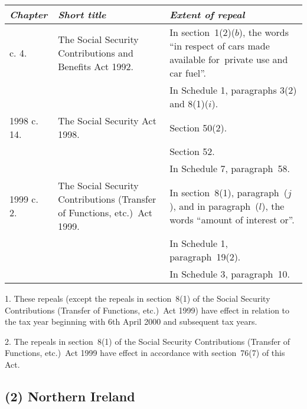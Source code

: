 \documentclass[12pt,a4paper]{article}
\begin{document}
{\footnotesize
\begin{longtable}{p{45.96pt}p{134.92946pt}p{173.11526pt}}
\hline
\itshape Chapter	&\itshape Short title	&\itshape Extent of repeal\\
\hline
\endhead
\hline
\endlastfoot
1992 c. 4. &	The Social Security Contributions and Benefits Act 1992. 	&In section~1(2)($b$), the words “in respect of cars made available for~private use and car fuel”.\\
&		&In Schedule 1, paragraphs 3(2)  and 8(1)($i$).\\
1998 c. 14. 	&The Social Security Act 1998. 	&Section 50(2).\\
&&		Section 52. \\
&&		In Schedule 7, paragraph~58. \\
1999 c. 2. 	&The Social Security Contributions (Transfer of Functions, etc.)\ Act 1999. 	&In section~8(1), paragraph~($j$), and in paragraph~($l$), the words “amount of interest or”.\\
&&		In Schedule 1, paragraph~19(2).\\
	&&	In Schedule 3, paragraph~10. \\
\end{longtable}

}

1. 
These repeals (except the repeals in section~8(1)  of the Social Security Contributions (Transfer of Functions, etc.)\ Act 1999) have effect in relation to the tax year beginning with 6th April 2000 and subsequent tax years.

2. 
The repeals in section~8(1)  of the Social Security Contributions (Transfer of Functions, etc.)\ Act 1999 have effect in accordance with section~76(7)  of this Act.

\pagebreak[3]

\subsection*{
(2) 
Northern Ireland}
\end{document}
